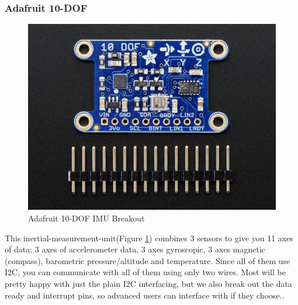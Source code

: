 \subsubsection{Adafruit 10-DOF} %
\label{ssub:adafruit_10_dof}
\begin{figure}[H]
\begin{center}
\captionsetup{font=small}
\includegraphics[scale=0.9]{pics/10dof.jpg}
\caption{Adafruit 10-DOF IMU Breakout\cite{ada_10dof}}
\label{fig:10dof}
\end{center}
\end{figure}
This inertial-measurement-unit(Figure \ref{fig:10dof}) combines 3 sensors  to give you 11 axes of data: 3 axes of accelerometer data, 3 axes gyroscopic, 3 axes magnetic (compass), barometric pressure/altitude and temperature. Since all of them use I2C, you can communicate with all of them using only two wires. Most will be pretty happy with just the plain I2C interfacing, but we also break out the data ready and interrupt pins, so advanced users can interface with if they choose.\cite{ada_10dof}.
